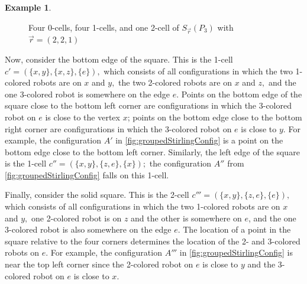 \documentclass{amsart}
\newcommand{\Sr}{S_{\vec{r}}}
\newcommand{\vertex}[3][1]{
\node [circle,  fill, inner sep = 0pt,outer sep = 0pt, minimum size=#1mm] (#3) at #2 {};
}
\theoremstyle{definition}
\newtheorem{ex}[thm]{Example}
\theoremstyle{remark}
\begin{document}
\begin{ex}
\begin{figure}[h!]
    \caption{Four 0-cells, four 1-cells, and one 2-cell of $\Sr(P_3)$ with $\vec r=(2,2,1)$}
    \label{fig:2Cell}
\end{figure}

Now, consider the bottom edge of the square. This is the 1-cell $c'=(\{x,y\},\{x,z\},\{e\}),$ which consists of all configurations in which the two 1-colored robots are on $x$ and $y,$ the two 2-colored robots are on $x$ and $z,$ and the one 3-colored robot is somewhere on the edge $e.$ Points on the bottom edge of the square close to the bottom left corner are configurations in which the 3-colored robot on $e$ is close to the vertex $x$; points on the bottom edge close to the bottom right corner are configurations in which the 3-colored robot on $e$ is close to $y.$ For example, the configuration $A'$ in \cref{fig:groupedStirlingConfig} is a point on the bottom edge close to the bottom left corner.  Similarly, the left edge of the square is the 1-cell $c''=(\{x,y\},\{z,e\},\{x\});$ the configuration $A''$ from \cref{fig:groupedStirlingConfig} falls on this 1-cell.

Finally, consider the solid square. This is the 2-cell $c'''=(\{x,y\},\{z,e\},\{e\}),$ which consists of all configurations in which the two 1-colored robots are on $x$ and $y,$ one 2-colored robot is on $z$ and the other is somewhere on $e$, and the one 3-colored robot is also somewhere on the edge $e.$ The location of a point in the square relative to the four corners determines the location of the 2- and 3-colored robots on $e.$ For example, the configuration $A'''$ in \cref{fig:groupedStirlingConfig} is near the top left corner since the 2-colored robot on $e$ is close to $y$ and the 3-colored robot on $e$ is close to $x.$ 
\end{ex}
\end{document}
